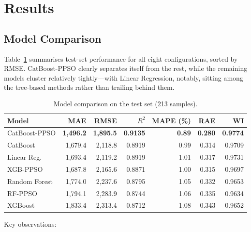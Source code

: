 \section{Results}\label{sec:results}

\subsection{Model Comparison}

Table~\ref{tab:model_comparison} summarises test-set performance for all eight configurations, sorted by RMSE. CatBoost-PPSO clearly separates itself from the rest, while the remaining models cluster relatively tightly---with Linear Regression, notably, sitting among the tree-based methods rather than trailing behind them.

\begin{table}[H]
\centering
\caption{Model comparison on the test set (213 samples).}
\label{tab:model_comparison}
\begin{tabular}{@{}lrrrrrr@{}}
\toprule
\textbf{Model} & \textbf{MAE} & \textbf{RMSE} & \textbf{$R^2$} & \textbf{MAPE (\%)} & \textbf{RAE} & \textbf{WI} \\
\midrule
CatBoost-PPSO & \textbf{1{,}496.2} & \textbf{1{,}895.5} & \textbf{0.9135} & \textbf{0.89} & \textbf{0.280} & \textbf{0.9774} \\
CatBoost & 1{,}679.4 & 2{,}118.8 & 0.8919 & 0.99 & 0.314 & 0.9709 \\
Linear Reg. & 1{,}693.4 & 2{,}119.2 & 0.8919 & 1.01 & 0.317 & 0.9731 \\
XGB-PPSO & 1{,}687.8 & 2{,}165.6 & 0.8871 & 1.00 & 0.315 & 0.9697 \\
Random Forest & 1{,}774.0 & 2{,}237.6 & 0.8795 & 1.05 & 0.332 & 0.9653 \\
RF-PPSO & 1{,}794.1 & 2{,}283.9 & 0.8744 & 1.06 & 0.335 & 0.9634 \\
XGBoost & 1{,}833.4 & 2{,}313.4 & 0.8712 & 1.08 & 0.343 & 0.9652 \\
\bottomrule
\end{tabular}
\end{table}

Key observations:

